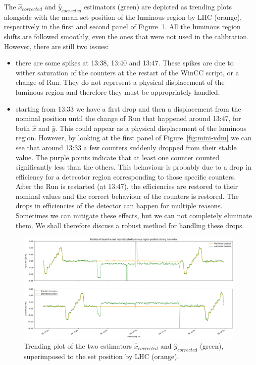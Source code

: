 The $\hat{x}_{corrected}$ and $\hat{y}_{corrected}$ estimators (green) are depicted as trending plots alongside with the mean set position of the luminous region by LHC (orange), respectively in the first and second panel of Figure~\ref{fig:traceplot_outliers}. All the luminous region shifts are followed smoothly, even the ones that were not used in the calibration. However, there are still two issues:
\begin{itemize}
    \item there are some spikes at 13:38, 13:40 and 13:47. These spikes are due to wither saturation of the counters at the restart of the WinCC script, or a change of Run. They do not represent a physical displacement of the luminous region and therefore they must be appropriately handled.
    \item starting from 13:33 we have a first drop and then a displacement from the nominal position until the change of Run that happened around 13:47, for both $\hat{x}$ and $\hat{y}$. This could appear as a physical displacement of the luminous region. However, by looking at the first panel of Figure~\ref{fig:mini-vdm} we can see that around 13:33 a few counters suddenly dropped from their stable value. The purple points indicate that at least one counter counted significantly less than the others. This behaviour is probably due to a drop in efficiency for a detecotor region corresponding to those specific counters. After the Run is restarted (at 13:47), the efficiencies are restored to their nominal values and the correct behaviour of the counters is restored. The drops in efficiencies of the detector can happen for multiple reasons. Sometimes we can mitigate these effects, but we can not completely eliminate them. We shall therefore discuss a robust method for handling these drops.
\end{itemize}

\begin{figure}
    \centering
    \includegraphics[width=\textwidth]{figures/traceplot_wo_median.png}
    \caption{Trending plot of the two estimators $\hat{x}_{corrected}$ and $\hat{y}_{corrected}$ (green), superimposed to the set position by LHC (orange).  }
    \label{fig:traceplot_outliers}
\end{figure}

